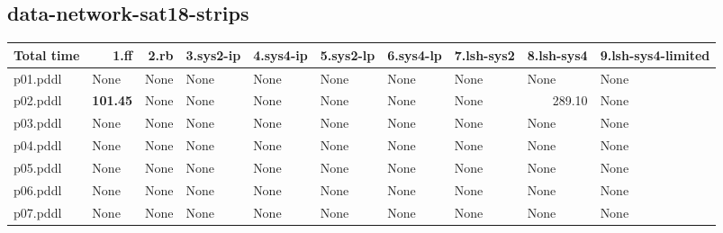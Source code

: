 \documentclass{article}
\begin{document}
\hypertarget{total_time-data-network-sat18-strips}{}
\subsection*{data-network-sat18-strips}

\begin{tabular}{@{}lrrrrrrrrr@{}}
Total time & 1.ff & 2.rb & 3.sys2-ip & 4.sys4-ip & 5.sys2-lp & 6.sys4-lp & 7.lsh-sys2 & 8.lsh-sys4 & 9.lsh-sys4-limited \\
\midrule
p01.pddl & \multicolumn{1}{|l|}{None} & \multicolumn{1}{|l|}{None} & \multicolumn{1}{|l|}{None} & \multicolumn{1}{|l|}{None} & \multicolumn{1}{|l|}{None} & \multicolumn{1}{|l|}{None} & \multicolumn{1}{|l|}{None} & \multicolumn{1}{|l|}{None} & \multicolumn{1}{|l|}{None} \\
p02.pddl & \textbf{101.45} & \multicolumn{1}{|l|}{None} & \multicolumn{1}{|l|}{None} & \multicolumn{1}{|l|}{None} & \multicolumn{1}{|l|}{None} & \multicolumn{1}{|l|}{None} & \multicolumn{1}{|l|}{None} & 289.10 & \multicolumn{1}{|l|}{None} \\
p03.pddl & \multicolumn{1}{|l|}{None} & \multicolumn{1}{|l|}{None} & \multicolumn{1}{|l|}{None} & \multicolumn{1}{|l|}{None} & \multicolumn{1}{|l|}{None} & \multicolumn{1}{|l|}{None} & \multicolumn{1}{|l|}{None} & \multicolumn{1}{|l|}{None} & \multicolumn{1}{|l|}{None} \\
p04.pddl & \multicolumn{1}{|l|}{None} & \multicolumn{1}{|l|}{None} & \multicolumn{1}{|l|}{None} & \multicolumn{1}{|l|}{None} & \multicolumn{1}{|l|}{None} & \multicolumn{1}{|l|}{None} & \multicolumn{1}{|l|}{None} & \multicolumn{1}{|l|}{None} & \multicolumn{1}{|l|}{None} \\
p05.pddl & \multicolumn{1}{|l|}{None} & \multicolumn{1}{|l|}{None} & \multicolumn{1}{|l|}{None} & \multicolumn{1}{|l|}{None} & \multicolumn{1}{|l|}{None} & \multicolumn{1}{|l|}{None} & \multicolumn{1}{|l|}{None} & \multicolumn{1}{|l|}{None} & \multicolumn{1}{|l|}{None} \\
p06.pddl & \multicolumn{1}{|l|}{None} & \multicolumn{1}{|l|}{None} & \multicolumn{1}{|l|}{None} & \multicolumn{1}{|l|}{None} & \multicolumn{1}{|l|}{None} & \multicolumn{1}{|l|}{None} & \multicolumn{1}{|l|}{None} & \multicolumn{1}{|l|}{None} & \multicolumn{1}{|l|}{None} \\
p07.pddl & \multicolumn{1}{|l|}{None} & \multicolumn{1}{|l|}{None} & \multicolumn{1}{|l|}{None} & \multicolumn{1}{|l|}{None} & \multicolumn{1}{|l|}{None} & \multicolumn{1}{|l|}{None} & \multicolumn{1}{|l|}{None} & \multicolumn{1}{|l|}{None} & \multicolumn{1}{|l|}{None} \\

\end{tabular}
\end{document}
